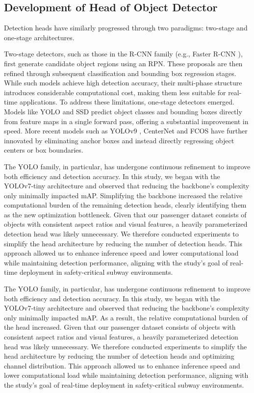 \documentclass[journal,twoside,web]{ieeecolor}
\begin{document}
\subsection{Development of Head of Object Detector}
Detection heads have similarly progressed through two paradigms: two-stage and one-stage architectures.

Two-stage detectors, such as those in the R-CNN \cite{girshick2014rich} family (e.g., Faster R-CNN \cite{ren2016faster}), first generate candidate object regions using an \ac{RPN}. These proposals are then refined through subsequent classification and bounding box regression stages. While such models achieve high detection accuracy, their multi-phase structure introduces considerable computational cost, making them less suitable for real-time applications. To address these limitations, one-stage detectors emerged. Models like YOLO \cite{redmon2016you} and SSD \cite{liu2016ssd} predict object classes and bounding boxes directly from feature maps in a single forward pass, offering a substantial improvement in speed. More recent models such as YOLOv9 \cite{wang2024yolov9}, CenterNet \cite{duan2019centernet} and FCOS \cite{tian2019fcos} have further innovated by eliminating anchor boxes and instead directly regressing object centers or box boundaries.  


The YOLO family, in particular, has undergone continuous refinement to improve both efficiency and detection accuracy. In this study, we began with the YOLOv7-tiny architecture and observed that reducing the backbone’s complexity only minimally impacted \ac{mAP}. Simplifying the backbone increased the relative computational burden of the remaining detection heads, clearly identifying them as the new optimization bottleneck. Given that our passenger dataset consists of objects with consistent aspect ratios and visual features, a heavily parameterized detection head was likely unnecessary. We therefore conducted experiments to simplify the head architecture by reducing the number of detection heads. This approach allowed us to enhance inference speed and lower computational load while maintaining detection performance, aligning with the study's goal of real-time deployment in safety-critical subway environments.

The YOLO family, in particular, has undergone continuous refinement to improve both efficiency and detection accuracy. In this study, we began with the YOLOv7-tiny architecture and observed that reducing the backbone’s complexity only minimally impacted \ac{mAP}. As a result, the relative computational burden of the head increased. 
Given that our passenger dataset consists of objects with consistent aspect ratios and visual features, a heavily parameterized detection head was likely unnecessary. We therefore conducted experiments to simplify the head architecture by reducing the number of detection heads and optimizing channel distribution. This approach allowed us to enhance inference speed and lower computational load while maintaining detection performance, aligning with the study's goal of real-time deployment in safety-critical subway environments. 
\end{document}
